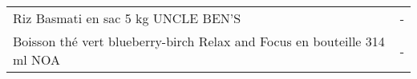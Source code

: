 \begin{longtable}{p{5cm}p{10cm}}
                                                                      Riz Basmati en sac 5 kg UNCLE BEN'S &                                                                                                                                                                                                                                                                                                                                                                                                                                                                                                                                                                                                                                                                                                                                                                                                                                                                                                                                                                                                                                        - \\
                                 Boisson thé vert blueberry-birch Relax and Focus en bouteille 314 ml NOA &                                                                                                                                                                                                                                                                                                                                                                                                                                                                                                                                                                                                                                                                                                                                                                                                                                                                                                                                                                                                                                        - \\

\end{longtable}
